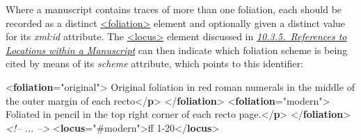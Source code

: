 Where a manuscript contains traces of more than one foliation, each should be recorded as a distinct \hyperref[TEI.foliation]{<foliation>} element and optionally given a distinct value for its {\itshape xml:id} attribute. The \hyperref[TEI.locus]{<locus>} element discussed in \textit{\hyperref[msloc]{10.3.5.\ References to Locations within a Manuscript}} can then indicate which foliation scheme is being cited by means of its {\itshape scheme} attribute, which points to this identifier: \par\bgroup{}\exampleFont \begin{shaded}\noindent\mbox{}{<\textbf{foliation}\hspace*{1em}{xml:id}="{original}">}\mbox{}\newline 
{}Original foliation in red roman numerals in the\mbox{}\newline 
\hspace*{1em}\hspace*{1em} middle of the outer margin of each recto{</\textbf{p}>}\mbox{}\newline 
{</\textbf{foliation}>}\mbox{}\newline 
{<\textbf{foliation}\hspace*{1em}{xml:id}="{modern}">}\mbox{}\newline 
{}Foliated in pencil in the top right corner of each\mbox{}\newline 
\hspace*{1em}\hspace*{1em} recto page.{</\textbf{p}>}\mbox{}\newline 
{</\textbf{foliation}>}\mbox{}\newline 
\textit{<!-- ... -->}\mbox{}\newline 
{<\textbf{locus}\hspace*{1em}{scheme}="{\#modern}">}ff 1-20{</\textbf{locus}>}\end{shaded}\egroup\par 
